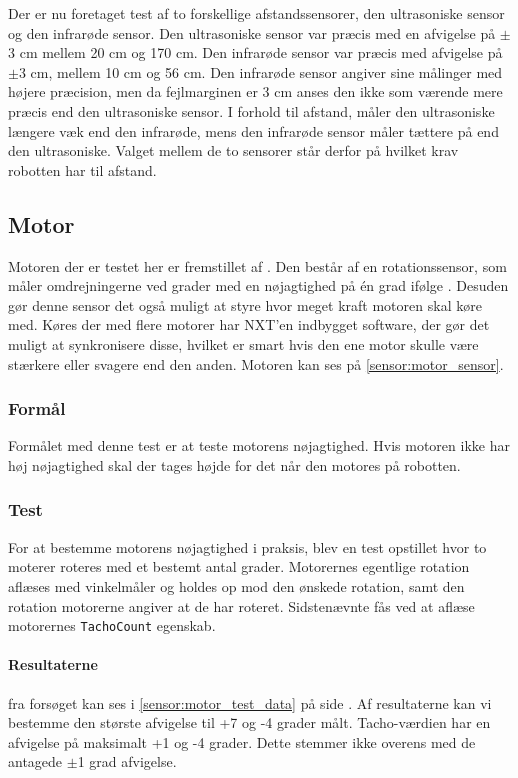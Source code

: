 Der er nu foretaget test af to forskellige afstandssensorer, den ultrasoniske sensor og den infrarøde sensor. 
Den ultrasoniske sensor var præcis med en afvigelse på $\pm$3 cm mellem 20 cm og 170 cm.
Den infrarøde sensor var præcis med afvigelse på $\pm$3 cm, mellem 10 cm og 56 cm.
Den infrarøde sensor angiver sine målinger med højere præcision, men da fejlmarginen er 3 cm anses den ikke som værende mere præcis end den ultrasoniske sensor.
I forhold til afstand, måler den ultrasoniske længere væk end den infrarøde, mens den infrarøde sensor måler tættere på end den ultrasoniske.
Valget mellem de to sensorer står derfor på hvilket krav robotten har til afstand.

\subsection{Motor}\label{sensorer:motorer}
Motoren der er testet her er fremstillet af \lego.
Den består af en rotationssensor, som måler omdrejningerne ved grader med en nøjagtighed på \'en grad ifølge \lego. 
Desuden gør denne sensor det også muligt at styre hvor meget kraft motoren skal køre med.
Køres der med flere motorer har NXT'en indbygget software, der gør det muligt at synkronisere disse, hvilket er smart hvis den ene motor skulle være stærkere eller svagere end den anden.\cite{tikNXT}
Motoren kan ses på \cref{sensor:motor_sensor}.

\subsubsection{Formål}
Formålet med denne test er at teste motorens nøjagtighed.
Hvis motoren ikke har høj nøjagtighed skal der tages højde for det når den motores på robotten.

\subsubsection{Test}
For at bestemme motorens nøjagtighed i praksis, blev en test opstillet hvor to moterer roteres med et bestemt antal grader.
Motorernes egentlige rotation aflæses med vinkelmåler og holdes op mod den ønskede rotation, samt den rotation motorerne angiver at de har roteret.
Sidstenævnte fås ved at aflæse motorernes \lstinline[style=csharp]!TachoCount! egenskab.

\paragraph{Resultaterne} fra forsøget kan ses i \cref{sensor:motor_test_data} på side \pageref{sensor:motor_test_data}.
Af resultaterne kan vi bestemme den største afvigelse til +7 og -4 grader målt.
Tacho-værdien har en afvigelse på maksimalt +1 og -4 grader.
Dette stemmer ikke overens med de antagede $\pm$1 grad afvigelse.

